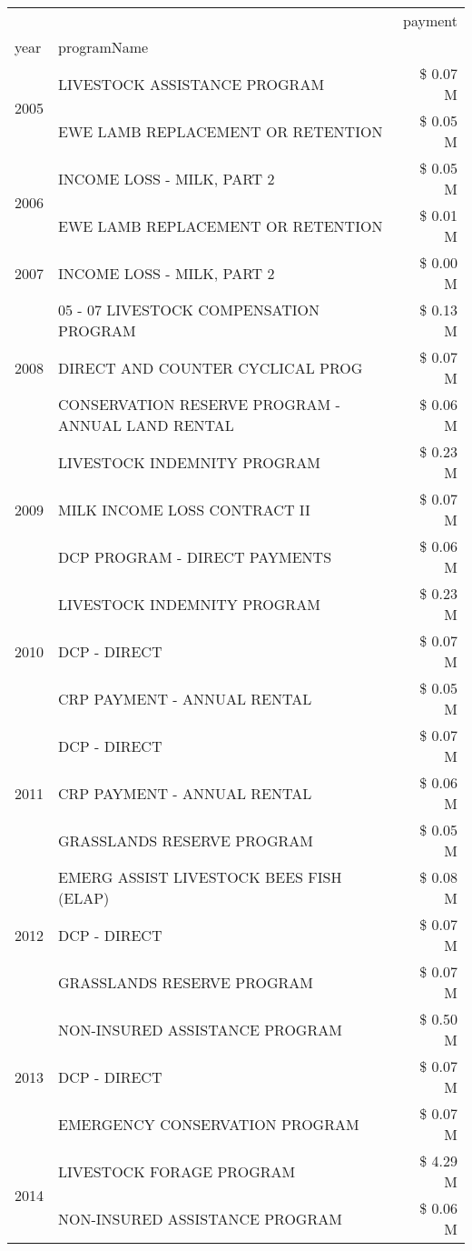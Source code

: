 \begin{tabular}{llr}
\toprule
 &  & payment \\
year & programName &  \\
\midrule
\multirow[t]{2}{*}{2005} & LIVESTOCK ASSISTANCE PROGRAM & \$ 0.07 M \\
 & EWE LAMB REPLACEMENT OR RETENTION & \$ 0.05 M \\
\cline{1-3}
\multirow[t]{2}{*}{2006} & INCOME LOSS - MILK, PART 2 & \$ 0.05 M \\
 & EWE LAMB REPLACEMENT OR RETENTION & \$ 0.01 M \\
\cline{1-3}
2007 & INCOME LOSS - MILK, PART 2 & \$ 0.00 M \\
\cline{1-3}
\multirow[t]{3}{*}{2008} & 05 - 07 LIVESTOCK COMPENSATION PROGRAM & \$ 0.13 M \\
 & DIRECT AND COUNTER CYCLICAL PROG & \$ 0.07 M \\
 & CONSERVATION RESERVE PROGRAM - ANNUAL LAND RENTAL & \$ 0.06 M \\
\cline{1-3}
\multirow[t]{3}{*}{2009} & LIVESTOCK INDEMNITY PROGRAM & \$ 0.23 M \\
 & MILK INCOME LOSS CONTRACT II & \$ 0.07 M \\
 & DCP PROGRAM - DIRECT PAYMENTS & \$ 0.06 M \\
\cline{1-3}
\multirow[t]{3}{*}{2010} & LIVESTOCK INDEMNITY PROGRAM & \$ 0.23 M \\
 & DCP - DIRECT & \$ 0.07 M \\
 & CRP PAYMENT - ANNUAL RENTAL & \$ 0.05 M \\
\cline{1-3}
\multirow[t]{3}{*}{2011} & DCP - DIRECT & \$ 0.07 M \\
 & CRP PAYMENT - ANNUAL RENTAL & \$ 0.06 M \\
 & GRASSLANDS RESERVE PROGRAM & \$ 0.05 M \\
\cline{1-3}
\multirow[t]{3}{*}{2012} & EMERG ASSIST LIVESTOCK BEES FISH (ELAP) & \$ 0.08 M \\
 & DCP - DIRECT & \$ 0.07 M \\
 & GRASSLANDS RESERVE PROGRAM & \$ 0.07 M \\
\cline{1-3}
\multirow[t]{3}{*}{2013} & NON-INSURED ASSISTANCE PROGRAM & \$ 0.50 M \\
 & DCP - DIRECT & \$ 0.07 M \\
 & EMERGENCY CONSERVATION PROGRAM & \$ 0.07 M \\
\cline{1-3}
\multirow[t]{3}{*}{2014} & LIVESTOCK FORAGE PROGRAM & \$ 4.29 M \\
 & NON-INSURED ASSISTANCE PROGRAM & \$ 0.06 M \\

\end{tabular}
